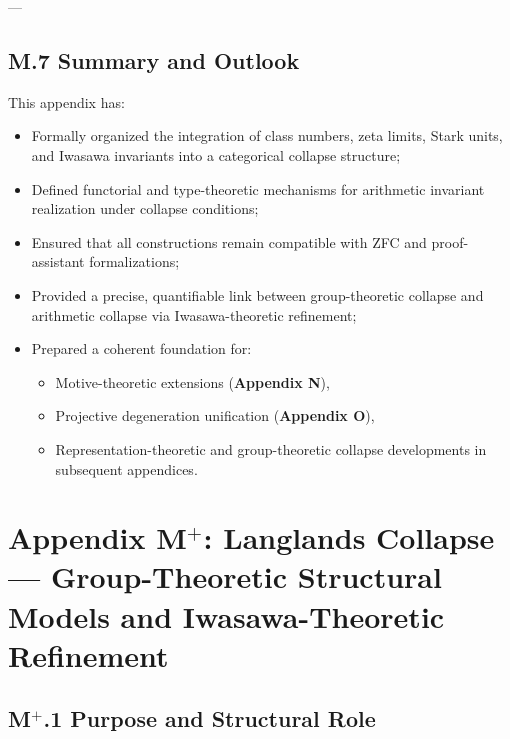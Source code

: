 \documentclass[11pt]{article}
\begin{document}
---

\subsection*{M.7 Summary and Outlook}

This appendix has:
\begin{itemize}
  \item Formally organized the integration of class numbers, zeta limits, Stark units, and Iwasawa invariants into a categorical collapse structure;
  \item Defined functorial and type-theoretic mechanisms for arithmetic invariant realization under collapse conditions;
  \item Ensured that all constructions remain compatible with ZFC and proof-assistant formalizations;
  \item Provided a precise, quantifiable link between group-theoretic collapse and arithmetic collapse via Iwasawa-theoretic refinement;
  \item Prepared a coherent foundation for:
  \begin{itemize}
    \item Motive-theoretic extensions (\textbf{Appendix N}),
    \item Projective degeneration unification (\textbf{Appendix O}),
    \item Representation-theoretic and group-theoretic collapse developments in subsequent appendices.
  \end{itemize}
\end{itemize}





\section*{Appendix M$^{+}$: Langlands Collapse — Group-Theoretic Structural Models and Iwasawa-Theoretic Refinement}

\subsection*{M$^{+}$.1 Purpose and Structural Role}
\end{document}
